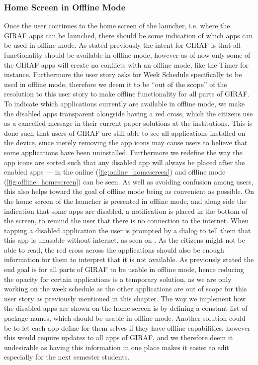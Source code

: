 \subsubsection{Home Screen in Offline Mode}
Once the user continues to the home screen of the launcher, i.e. where the GIRAF apps can be launched, there should be some indication of which apps can be used in offline mode. 
As stated previously the intent for GIRAF is that all functionality should be available in offline mode, however as of now only some of the GIRAF apps will create no conflicts with an offline mode, like the Timer for instance. 
Furthermore the user story asks for Week Schedule specifically to be used in offline mode, therefore we deem it to be \enquote{out of the scope} of the resolution to this user story to make offline functionality for all parts of GIRAF.
To indicate which applications currently are available in offline mode, we make the disabled apps transparent alongside having a red cross, which the citizens use as a cancelled message in their current paper solutions at the institutions.
This is done such that users of GIRAF are still able to see all applications installed on the device, since merely removing the app icons may cause users to believe that some applications have been uninstalled.
Furthermore we redefine the way the app icons are sorted such that any disabled app will always be placed after the enabled apps --- in  the online (\ref{fig:online_homescreen}) and offline mode (\ref{fig:offline_homescreen}) can be seen.
As well as avoiding confusion among users, this also helps toward the goal of offline mode being as convenient as possible.
On  the home screen of the launcher is presented in offline mode, and along side the indication that some apps are disabled, a notification is placed in the bottom of the screen, to remind the user that there is no connection to the internet.
When tapping a disabled application the user is prompted by a dialog to tell them that this app is unusable without internet, as seen on . 
As the citizens might not be able to read, the red cross across the applications should also be enough information for them to interpret that it is not available.
As previously stated the end goal is for all parts of GIRAF to be usable in offline mode, hence reducing the opacity for certain applications is a temporary solution, as we are only working on the week schedule as the other applications are out of scope for this user story as previously mentioned in this chapter.
The way we implement how the disabled apps are shown on the home screen is by defining a constant list of package names, which should be usable in offline mode.
Another solution could be to let each app define for them selves if they have offline capabilities, however this would require updates to all apps of GIRAF, and we therefore deem it undesirable as having this information in one place makes it easier to edit especially for the next semester students.

